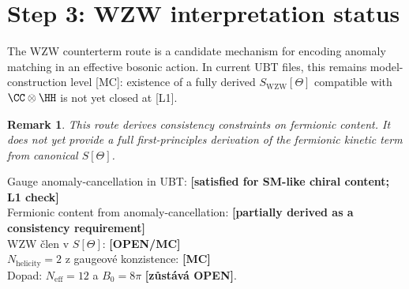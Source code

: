 \documentclass[12pt,a4paper]{article}
\newtheorem{remark}[proposition]{Remark}
\begin{document}
\section{Step 3: WZW interpretation status}
The WZW counterterm route is a candidate mechanism for encoding anomaly
matching in an effective bosonic action. In current UBT files, this remains
model-construction level [MC]: existence of a fully derived
\(
S_{\mathrm{WZW}}[\Theta]
\)
compatible with \(\CC\otimes\HH\) is not yet closed at [L1].

\begin{remark}
This route derives \emph{consistency constraints} on fermionic content.
It does not yet provide a full first-principles derivation of the fermionic
kinetic term from canonical \(S[\Theta]\).
\end{remark}

\begin{statusbox}
Gauge anomaly-cancellation in UBT: \textbf{[satisfied for SM-like chiral content; L1 check]}\\
Fermionic content from anomaly-cancellation: \textbf{[partially derived as a consistency requirement]}\\
WZW člen v $S[\Theta]$: \textbf{[OPEN/MC]}\\
$N_{\mathrm{helicity}}=2$ z gaugeové konzistence: \textbf{[MC]}\\
Dopad: $N_{\mathrm{eff}}=12$ a $B_0=8\pi$ \textbf{[zůstává OPEN]}.
\end{statusbox}
\end{document}
